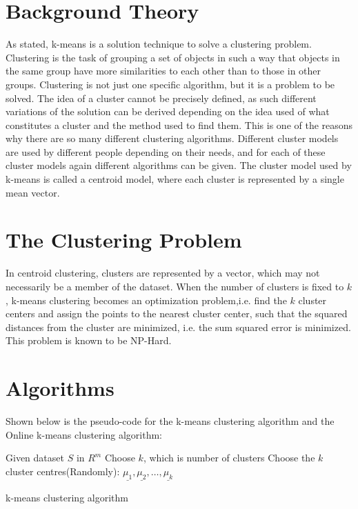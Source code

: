 \documentclass{article}
\begin{document}
\section{Background Theory}
As stated, k-means is a solution technique to solve a clustering problem. Clustering is the task of grouping a set of objects in such a way that objects in the same group have more similarities to each other than to those in other groups. Clustering is not just one specific algorithm, but it is a problem to be solved. The idea of a cluster cannot be precisely defined, as such different variations of the solution can be derived depending on the idea used of what constitutes a cluster and the method used to find them. This is one of the reasons why there are so many different clustering algorithms. Different cluster models are used by different people depending on their needs, and for each of these cluster models again different algorithms can be given. The cluster model used by k-means is called a centroid model, where each cluster is represented by a single mean vector.

\section{The Clustering Problem}
In centroid clustering, clusters are represented by a vector, which may not necessarily be a member of the dataset. When the number of clusters is fixed to $k$, k-means clustering becomes an optimization problem,i.e. find the $k$ cluster centers and assign the points to the nearest cluster center, such that the squared distances from the cluster are minimized, i.e. the sum squared error is minimized. This problem is known to be NP-Hard.


\newpage


\section{Algorithms}
Shown below is the pseudo-code for the k-means clustering algorithm and the Online k-means clustering algorithm:

\begin{algorithm}[H]
\SetAlgoLined
 Given dataset $S$ in $R^m$\;
 Choose $k$, which is number of clusters\;
 Choose the $k$ cluster centres(Randomly): $\underline{\mu_1}, \underline{\mu_2}, \dots, \underline{\mu_k}$\;
 \caption{k-means clustering algorithm}
\end{algorithm}
\end{document}
